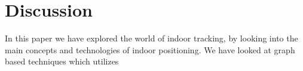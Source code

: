 \section{Discussion}
In this paper we have explored the world of indoor tracking, by looking into the main concepts and technologies of indoor positioning. 
We have looked at graph based techniques which utilizes 